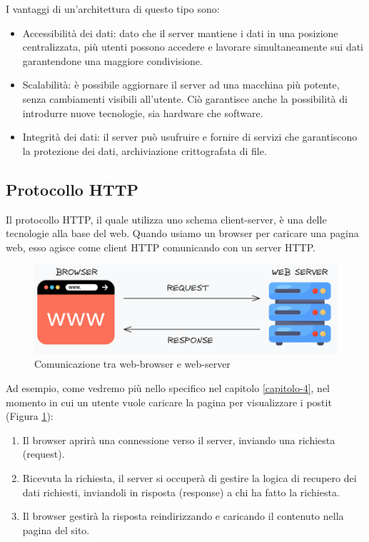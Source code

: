 I vantaggi di un'architettura di questo tipo sono:\cite{clientServerVantaggi}
\begin{itemize}
    \item Accessibilità dei dati: dato che il server mantiene i dati in una posizione centralizzata, più utenti possono accedere e lavorare simultaneamente sui dati garantendone una maggiore condivisione.
    \item Scalabilità: è possibile aggiornare il server ad una macchina più potente, senza cambiamenti visibili all'utente. Ciò garantisce anche la possibilità di introdurre nuove tecnologie, sia hardware che software.
    \item Integrità dei dati: il server può usufruire e fornire di servizi che garantiscono la protezione dei dati, archiviazione crittografata di file.
\end{itemize}
\subsection{Protocollo HTTP}
Il protocollo HTTP, il quale utilizza uno schema client-server, è una delle tecnologie alla base del web.
Quando usiamo un browser per caricare una pagina web, esso agisce come client HTTP comunicando con un server HTTP.\cite{protocolloHTTP}
\begin{figure}[h]
    \centering
    \includegraphics[width=1.0\textwidth]{images/request response.png}
    \caption{Comunicazione tra web-browser e web-server}
    \label{fig:request-response}
\end{figure}

Ad esempio, come vedremo più nello specifico nel capitolo \ref{capitolo-4}, nel momento in cui un utente vuole caricare la pagina per visualizzare i postit (Figura \ref{fig:request-response}):  
\begin{enumerate}
    \item Il browser aprirà una connessione verso il server, inviando una richiesta (request).
    \item Ricevuta la richiesta, il server si occuperà di gestire la logica di recupero dei dati richiesti, inviandoli in risposta (response) a chi ha fatto la richiesta.
    \item Il browser gestirà la risposta reindirizzando e caricando il contenuto nella pagina del sito.
\end{enumerate}
